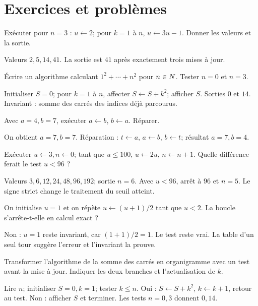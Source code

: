 \section{Exercices et problèmes}
\label{t11s-c07-e01}
Exécuter pour $n=3$ : $u\leftarrow2$; pour $k=1$ à $n$, $u\leftarrow3u-1$. Donner les valeurs et la sortie.
\begin{corrige}\label{sol-t11s-c07-e01}
Valeurs $2,5,14,41$. La sortie est $41$ après exactement trois mises à jour.
\end{corrige}
\label{t11s-c07-e02}
Écrire un algorithme calculant $1^2+\cdots+n^2$ pour $n\in N$. Tester $n=0$ et $n=3$.
\begin{corrige}\label{sol-t11s-c07-e02}
Initialiser $S=0$; pour $k=1$ à $n$, affecter $S\leftarrow S+k^2$; afficher $S$. Sorties $0$ et $14$. Invariant : somme des carrés des indices déjà parcourus.
\end{corrige}
\exo[Échanger]\label{t11s-c07-e03}
Avec $a=4,b=7$, exécuter $a\leftarrow b$, $b\leftarrow a$. Réparer.
\begin{corrige}\label{sol-t11s-c07-e03}
On obtient $a=7,b=7$. Réparation : $t\leftarrow a$, $a\leftarrow b$, $b\leftarrow t$; résultat $a=7,b=4$.
\end{corrige}
\label{t11s-c07-e04}
Exécuter $u\leftarrow3,n\leftarrow0$; tant que $u\le100$, $u\leftarrow2u$, $n\leftarrow n+1$. Quelle différence ferait le test $u<96$ ?
\begin{corrige}\label{sol-t11s-c07-e04}
Valeurs $3,6,12,24,48,96,192$; sortie $n=6$. Avec $u<96$, arrêt à $96$ et $n=5$. Le signe strict change le traitement du seuil atteint.
\end{corrige}
\label{t11s-c07-e05}
On initialise $u=1$ et on répète $u\leftarrow(u+1)/2$ tant que $u<2$. La boucle s’arrête-t-elle en calcul exact ?
\begin{corrige}\label{sol-t11s-c07-e05}
Non : $u=1$ reste invariant, car $(1+1)/2=1$. Le test reste vrai. La table d’un seul tour suggère l’erreur et l’invariant la prouve.
\end{corrige}
\exo[Dessiner]\label{t11s-c07-e06}
Transformer l’algorithme de la somme des carrés en organigramme avec un test avant la mise à jour. Indiquer les deux branches et l’actualisation de $k$.
\begin{corrige}\label{sol-t11s-c07-e06}
Lire $n$; initialiser $S=0,k=1$; tester $k\le n$. Oui : $S\leftarrow S+k^2$, $k\leftarrow k+1$, retour au test. Non : afficher $S$ et terminer. Les tests $n=0,3$ donnent $0,14$.
\end{corrige}

